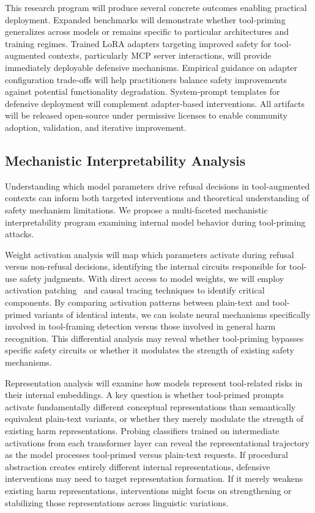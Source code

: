 \documentclass[compsoc,conference,a4paper,10pt,times]{IEEEtran}
\begin{document}
This research program will produce several concrete outcomes enabling practical deployment. Expanded benchmarks will demonstrate whether tool-priming generalizes across models or remains specific to particular architectures and training regimes. Trained LoRA adapters targeting improved safety for tool-augmented contexts, particularly MCP server interactions, will provide immediately deployable defensive mechanisms. Empirical guidance on adapter configuration trade-offs will help practitioners balance safety improvements against potential functionality degradation. System-prompt templates for defensive deployment will complement adapter-based interventions. All artifacts will be released open-source under permissive licenses to enable community adoption, validation, and iterative improvement.

\subsection{Mechanistic Interpretability Analysis}

Understanding which model parameters drive refusal decisions in tool-augmented contexts can inform both targeted interventions and theoretical understanding of safety mechanism limitations. We propose a multi-faceted mechanistic interpretability program examining internal model behavior during tool-priming attacks.

Weight activation analysis will map which parameters activate during refusal versus non-refusal decisions, identifying the internal circuits responsible for tool-use safety judgments. With direct access to model weights, we will employ activation patching~\cite{meng2022locating} and causal tracing techniques to identify critical components. By comparing activation patterns between plain-text and tool-primed variants of identical intents, we can isolate neural mechanisms specifically involved in tool-framing detection versus those involved in general harm recognition. This differential analysis may reveal whether tool-priming bypasses specific safety circuits or whether it modulates the strength of existing safety mechanisms.

Representation analysis will examine how models represent tool-related risks in their internal embeddings. A key question is whether tool-primed prompts activate fundamentally different conceptual representations than semantically equivalent plain-text variants, or whether they merely modulate the strength of existing harm representations. Probing classifiers trained on intermediate activations from each transformer layer can reveal the representational trajectory as the model processes tool-primed versus plain-text requests. If procedural abstraction creates entirely different internal representations, defensive interventions may need to target representation formation. If it merely weakens existing harm representations, interventions might focus on strengthening or stabilizing those representations across linguistic variations.
\end{document}
